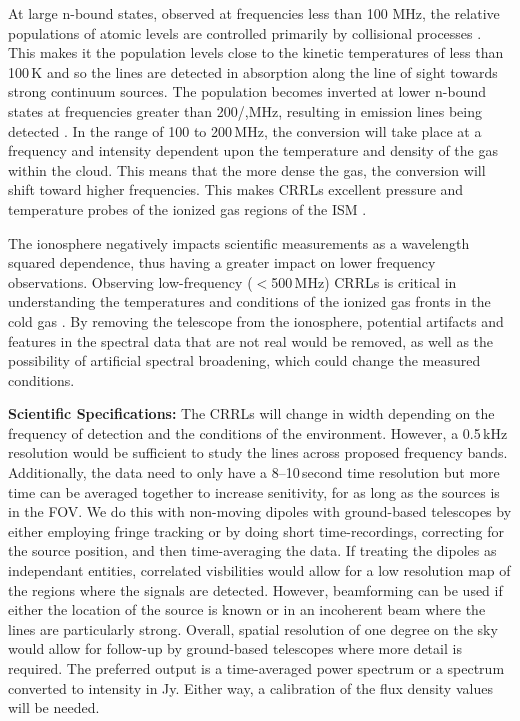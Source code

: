 At large n-bound states, observed at frequencies less than 100 MHz, the relative populations of atomic levels are controlled primarily by collisional processes \citep{Tremblay_2018}. This makes it the population levels close to the kinetic temperatures of less than 100\,K and so the lines are detected in absorption along the line of sight towards strong continuum sources. The population becomes inverted at lower n-bound states at frequencies greater than 200/,MHz, resulting in emission lines being detected \citep{Gordon-RRL}. In the range of 100 to 200\,MHz, the conversion will take place at a frequency and intensity dependent upon the temperature and density of the gas within the cloud. This means that the more dense the gas, the conversion will shift toward higher frequencies. This makes CRRLs excellent pressure and temperature probes of the ionized gas regions of the ISM \citep{Salas_2019}.

The ionosphere negatively impacts scientific measurements as a wavelength squared dependence, thus having a greater impact on lower frequency observations. Observing low-frequency ($<$500\,MHz) CRRLs is critical in understanding the temperatures and conditions of the ionized gas fronts in the cold gas \citep{Salas_2018}. By removing the telescope from the ionosphere, potential artifacts and features in the spectral data that are not real would be removed, as well as the possibility of artificial spectral broadening, which could change the measured conditions.

\textbf{Scientific Specifications:} The CRRLs will change in width depending on the frequency of detection and the conditions of the environment. However, a 0.5\,kHz resolution would be sufficient to study the lines across proposed frequency bands. Additionally, the data need to only have a 8--10\,second time resolution but more time can be averaged together to increase senitivity, for as long as the sources is in the FOV. We do this with non-moving dipoles with ground-based telescopes by either employing fringe tracking or by doing short time-recordings, correcting for the source position, and then time-averaging the data. If treating the dipoles as independant entities, correlated visbilities would allow for a low resolution map of the regions where the signals are detected. However, beamforming can be used if either the location of the source is known or in an incoherent beam where the lines are particularly strong. Overall, spatial resolution of one degree on the sky would allow for follow-up by ground-based telescopes where more detail is required. The preferred output is a time-averaged power spectrum or a spectrum converted to intensity in Jy. Either way, a calibration of the flux density values will be needed.


